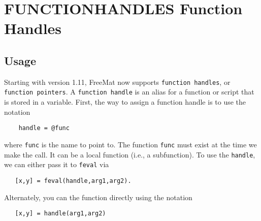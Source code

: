 \section{FUNCTIONHANDLES Function Handles}

\subsection{Usage}

Starting with version 1.11, FreeMat now supports \verb|function handles|,
or \verb|function pointers|.  A \verb|function handle| is an alias for a function
or script that is stored in a variable.  First, the way to assign
a function handle is to use the notation
\begin{verbatim}
    handle = @func
\end{verbatim}
where \verb|func| is the name to point to.  The function \verb|func| must exist
at the time we make the call.  It can be a local function (i.e., a
subfunction).  To use the \verb|handle|, we can either pass it to \verb|feval|
via 
\begin{verbatim}
   [x,y] = feval(handle,arg1,arg2).
\end{verbatim}
Alternately, you can the function directly using the notation
\begin{verbatim}
   [x,y] = handle(arg1,arg2)
\end{verbatim}

